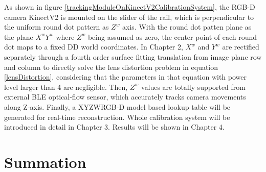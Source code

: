 As shown in figure \ref{trackingModuleOnKinectV2CalibrationSystem}, the RGB-D camera KinectV2 is mounted on the slider of the rail, which is perpendicular to the uniform round dot pattern as \(Z^{w}\) axis. With the round dot patten plane as the plane \(X^wY^w\) where \(Z^{w}\) being assumed as zero, the center point of each round dot maps to a fixed DD world coordinates. In Chapter 2, \(X^{w}\) and \(Y^{w}\) are rectified separately through a fourth order surface fitting translation from image plane row and column to directly solve the lens distortion problem in equation \ref{lensDistortion}, considering that the parameters in that equation with power level larger than 4 are negligible. Then, \(Z^{w}\) values are totally supported from external BLE optical-flow sensor, which accurately tracks camera movements along Z-axis. Finally, a XYZWRGB-D model based lookup table will be generated for real-time reconstruction. Whole calibration system will be introduced in detail in Chapter 3. Results will be shown in Chapter 4.





\section{Summation}













































